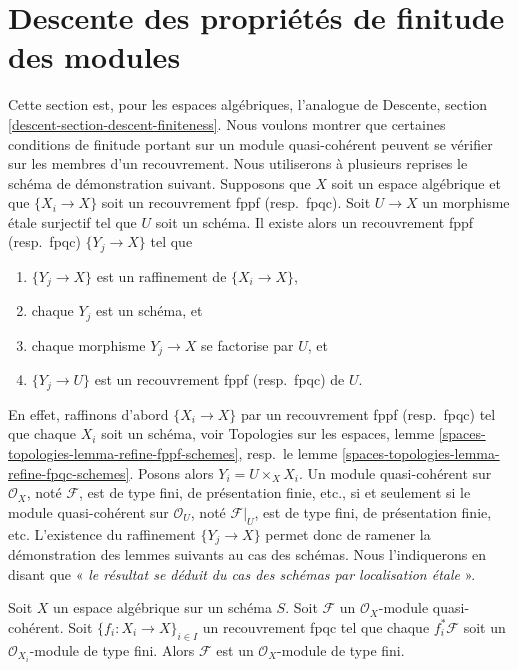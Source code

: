 \section{Descente des propriétés de finitude des modules}
\label{section-descent-finiteness}

\noindent
Cette section est, pour les espaces algébriques, l'analogue de
Descente, section \ref{descent-section-descent-finiteness}.
Nous voulons montrer que certaines conditions de finitude portant sur un module
quasi-cohérent peuvent se vérifier sur les membres d'un
recouvrement. Nous utiliserons à plusieurs reprises le schéma de démonstration suivant.
Supposons que $X$ soit un espace algébrique et que $\{X_i \to X\}$
soit un recouvrement fppf (resp.\ fpqc). Soit $U \to X$ un morphisme \'etale
surjectif tel que $U$ soit un schéma. Il existe alors un
recouvrement fppf (resp.\ fpqc) $\{Y_j \to X\}$ tel que
\begin{enumerate}
\item $\{Y_j \to X\}$ est un raffinement de $\{X_i \to X\}$,
\item chaque $Y_j$ est un schéma, et
\item chaque morphisme $Y_j \to X$ se factorise par $U$, et
\item $\{Y_j \to U\}$ est un recouvrement fppf (resp.\ fpqc) de $U$.
\end{enumerate}
En effet, raffinons d'abord $\{X_i \to X\}$ par un recouvrement fppf (resp.\ fpqc)
tel que chaque $X_i$ soit un schéma, voir
Topologies sur les espaces, lemme \ref{spaces-topologies-lemma-refine-fppf-schemes},
resp.\ le lemme \ref{spaces-topologies-lemma-refine-fpqc-schemes}.
Posons alors $Y_i = U \times_X X_i$. Un module quasi-cohérent
sur $\mathcal{O}_X$, noté $\mathcal{F}$, est de type fini, de
présentation finie, etc., si et seulement si le module quasi-cohérent
sur $\mathcal{O}_U$, noté $\mathcal{F}|_U$, est de type fini, de
présentation finie, etc. L'existence du
raffinement $\{Y_j \to X\}$ permet donc de ramener la démonstration des
lemmes suivants au cas des schémas. Nous l'indiquerons en disant
que « {\it le résultat se déduit du cas des schémas par
localisation \'etale} ».

\begin{lemma}
\label{lemma-finite-type-descends}
Soit $X$ un espace algébrique sur un schéma $S$.
Soit $\mathcal{F}$ un $\mathcal{O}_X$-module quasi-cohérent.
Soit $\{f_i : X_i \to X\}_{i \in I}$ un recouvrement fpqc tel que
chaque $f_i^*\mathcal{F}$ soit un $\mathcal{O}_{X_i}$-module de type fini.
Alors $\mathcal{F}$ est un $\mathcal{O}_X$-module de type fini.
\end{lemma}

